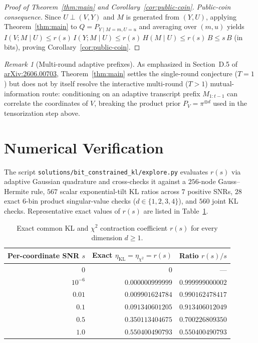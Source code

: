 \documentclass[11pt]{article}
\theoremstyle{plain}
\theoremstyle{definition}
\theoremstyle{remark}
\newtheorem{remark}{Remark}
\begin{document}
\begin{proof}[Proof of Theorem~\ref{thm:main} and Corollary~\ref{cor:public-coin}]
\emph{Public-coin consequence.} Since $U \perp (V, Y)$ and $M$ is generated from $(Y, U)$, applying Theorem~\ref{thm:main} to $Q = P_{Y \mid M=m, U=u}$ and averaging over $(m, u)$ yields $I(V; M \mid U) \le r(s)\,I(Y; M \mid U) \le r(s)\,H(M \mid U) \le r(s)\,B \le s\,B$ (in bits), proving Corollary~\ref{cor:public-coin}.
\end{proof}

\begin{remark}[Multi-round adaptive prefixes]
As emphasized in Section~D.5 of \href{https://arxiv.org/abs/2606.00703}{arXiv:2606.00703}, Theorem~\ref{thm:main} settles the single-round conjecture ($T = 1$) but does not by itself resolve the interactive multi-round ($T > 1$) mutual-information route: conditioning on an adaptive transcript prefix $M_{1:t-1}$ can correlate the coordinates of $V$, breaking the product prior $P_V = \pi^{\otimes d}$ used in the tensorization step above.
\end{remark}

\section{Numerical Verification}

The script \texttt{solutions/bit\_constrained\_kl/explore.py} evaluates $r(s)$ via adaptive Gaussian quadrature and cross-checks it against a $256$-node Gauss--Hermite rule, $567$ scalar exponential-tilt KL ratios across $7$ positive SNRs, $28$ exact $6$-bin product singular-value checks ($d \in \{1, 2, 3, 4\}$), and $560$ joint KL checks. Representative exact values of $r(s)$ are listed in Table~\ref{tab:snr}.

\begin{table}[ht]
\centering
\small
\begin{tabular}{@{}rrr@{}}
\toprule
Per-coordinate SNR $s$ & Exact $\eta_{\mathrm{KL}} = \eta_{\chi^2} = r(s)$ & Ratio $r(s)/s$ \\
\midrule
$0$ & $0$ & --- \\
$10^{-6}$ & $0.000000999999$ & $0.999999000002$ \\
$0.01$ & $0.009901624784$ & $0.990162478417$ \\
$0.1$ & $0.091340601205$ & $0.913406012049$ \\
$0.5$ & $0.350113404675$ & $0.700226809350$ \\
$1.0$ & $0.550400490793$ & $0.550400490793$ \\
\bottomrule
\end{tabular}
\caption{Exact common KL and $\chi^2$ contraction coefficient $r(s)$ for every dimension $d \ge 1$.}\label{tab:snr}
\end{table}
\end{document}
